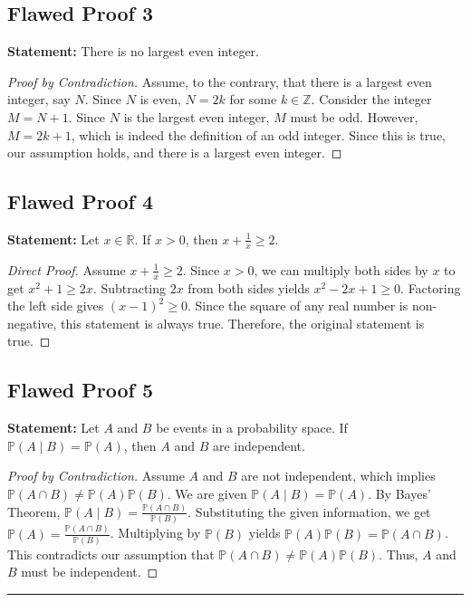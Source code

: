 \documentclass[11pt, a4paper]{article}
\theoremstyle{definition}
\theoremstyle{remark}
\newcommand{\R}{\mathbb{R}}
\newcommand{\Z}{\mathbb{Z}}
\newcommand{\Prob}{\mathbb{P}}
\begin{document}
\subsection{Flawed Proof 3}
\textbf{Statement:} There is no largest even integer.
\begin{proof}[Proof by Contradiction]
Assume, to the contrary, that there is a largest even integer, say $N$. 
Since $N$ is even, $N = 2k$ for some $k \in \Z$. 
Consider the integer $M = N + 1$. Since $N$ is the largest even integer, $M$ must be odd. 
However, $M = 2k + 1$, which is indeed the definition of an odd integer. 
Since this is true, our assumption holds, and there is a largest even integer.
\end{proof}

\subsection{Flawed Proof 4}
\textbf{Statement:} Let $x \in \R$. If $x > 0$, then $x + \frac{1}{x} \geq 2$.
\begin{proof}[Direct Proof]
Assume $x + \frac{1}{x} \geq 2$. 
Since $x > 0$, we can multiply both sides by $x$ to get $x^2 + 1 \geq 2x$. 
Subtracting $2x$ from both sides yields $x^2 - 2x + 1 \geq 0$. 
Factoring the left side gives $(x - 1)^2 \geq 0$. 
Since the square of any real number is non-negative, this statement is always true. 
Therefore, the original statement is true.
\end{proof}

\subsection{Flawed Proof 5}
\textbf{Statement:} Let $A$ and $B$ be events in a probability space. If $\Prob(A \mid B) = \Prob(A)$, then $A$ and $B$ are independent.
\begin{proof}[Proof by Contradiction]
Assume $A$ and $B$ are not independent, which implies $\Prob(A \cap B) \neq \Prob(A)\Prob(B)$. 
We are given $\Prob(A \mid B) = \Prob(A)$. 
By Bayes' Theorem, $\Prob(A \mid B) = \frac{\Prob(A \cap B)}{\Prob(B)}$. 
Substituting the given information, we get $\Prob(A) = \frac{\Prob(A \cap B)}{\Prob(B)}$. 
Multiplying by $\Prob(B)$ yields $\Prob(A)\Prob(B) = \Prob(A \cap B)$. 
This contradicts our assumption that $\Prob(A \cap B) \neq \Prob(A)\Prob(B)$. 
Thus, $A$ and $B$ must be independent.
\end{proof}

\vspace{1cm}
\hrule
\vspace{0.5cm}
\end{document}
